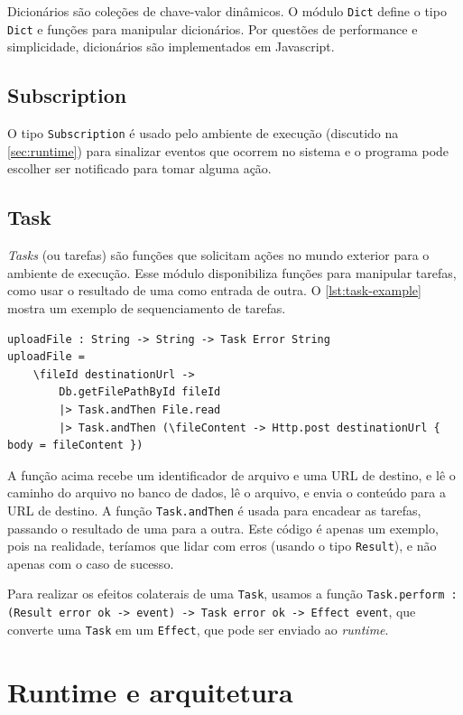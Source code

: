 Dicionários são coleções de chave-valor dinâmicos. O módulo \texttt{Dict} define
o tipo \texttt{Dict} e funções para manipular dicionários. Por questões de performance
e simplicidade, dicionários são implementados em Javascript.

\subsection{Subscription}

O tipo \texttt{Subscription} é usado pelo ambiente de execução (discutido na
\autoref{sec:runtime}) para sinalizar eventos que ocorrem no sistema e o programa
pode escolher ser notificado para tomar alguma ação.

\subsection{Task}

\textit{Tasks} (ou tarefas) são funções que solicitam ações no mundo exterior para
o ambiente de execução. Esse módulo disponibiliza funções para manipular tarefas,
como usar o resultado de uma como entrada de outra. O \autoref{lst:task-example}
mostra um exemplo de sequenciamento de tarefas.

\begin{lstlisting}[label={lst:task-example},caption={Exemplo de sequenciamento de tarefas}]
uploadFile : String -> String -> Task Error String
uploadFile =
    \fileId destinationUrl ->
        Db.getFilePathById fileId
        |> Task.andThen File.read
        |> Task.andThen (\fileContent -> Http.post destinationUrl { body = fileContent })
\end{lstlisting}

A função acima recebe um identificador de arquivo e uma URL de destino, e lê
o caminho do arquivo no banco de dados, lê o arquivo, e envia o conteúdo para
a URL de destino. A função \texttt{Task.andThen} é usada para encadear as tarefas,
passando o resultado de uma para a outra. Este código é apenas um exemplo, pois
na realidade, teríamos que lidar com erros (usando o tipo \texttt{Result}), e
não apenas com o caso de sucesso.

Para realizar os efeitos colaterais de uma \texttt{Task}, usamos a função
\texttt{Task.perform : (Result error ok -> event) -> Task error ok -> Effect event},
que converte uma \texttt{Task} em um \texttt{Effect}, que pode ser enviado ao
\textit{runtime}.

\section{Runtime e arquitetura}\label{sec:runtime}


